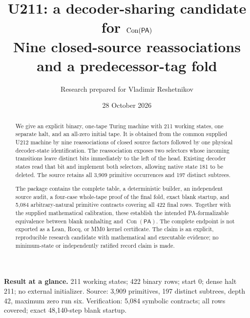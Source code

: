 \documentclass[11pt,a4paper]{article}
\title{\color{ink}\textbf{U211: a decoder-sharing candidate\\for $\Con(\PA)$}\\[7pt]
 \large Nine closed-source reassociations and a predecessor-tag fold}
\author{Research prepared for Vladimir Reshetnikov}
\date{28 October 2026}
\newcommand{\PA}{\mathsf{PA}}
\newcommand{\Con}{\operatorname{Con}}
\begin{document}
\maketitle
\thispagestyle{empty}
\begin{abstract}
We give an explicit binary, one-tape Turing machine with 211 working states,
one separate halt, and an all-zero initial tape. It is obtained from the
common supplied U212 machine by nine reassociations of closed source factors
followed by one physical decoder-state identification. The reassociation
exposes two selectors whose incoming transitions leave distinct bits immediately
to the left of the head. Existing decoder states read that bit and implement
both selectors, allowing native state 181 to be deleted. The source retains
all 3,909 primitive occurrences and 197 distinct subtrees.

The package contains the complete table, a deterministic builder, an independent
source audit, a four-case whole-tape proof of the final fold, exact blank startup,
and 5,084 arbitrary-natural primitive contracts covering all 422 final rows.
Together with the supplied mathematical calibration, these establish the intended
PA-formalizable equivalence between blank nonhalting and $\Con(\PA)$.
The complete endpoint is not exported as a Lean, Rocq, or MM0 kernel certificate.
The claim is an explicit, reproducible research candidate with mathematical
and executable evidence; no minimum-state or independently ratified record
claim is made.
\end{abstract}

\vspace{7pt}
\colorbox{pale}{\parbox{\dimexpr\linewidth-2\fboxsep\relax}{
\textbf{Result at a glance.} 211 working states; 422 binary rows; start 0;
dense halt 211; no external initializer. Source: 3,909 primitives, 197
distinct subtrees, depth 42, maximum zero run six. Verification: 5,084
symbolic contracts; all rows covered; exact 48,140-step blank startup.}}

\clearpage
\tableofcontents
\clearpage





\end{document}
